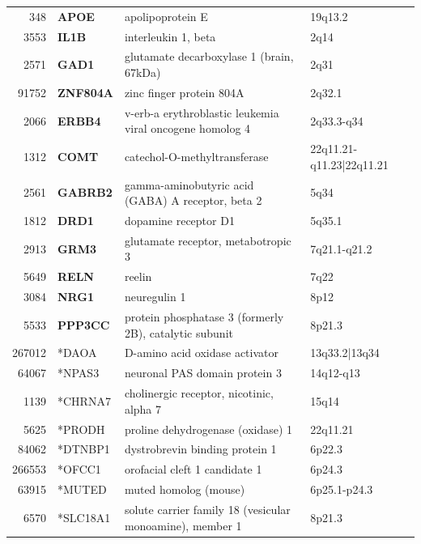 \begin{table}[]
\begin{tabular}{@{}rlll@{}}
348 & \textbf{APOE} & apolipoprotein E & 19q13.2 \\
3553 & \textbf{IL1B} & interleukin 1, beta & 2q14 \\
2571 & \textbf{GAD1} & glutamate decarboxylase 1 (brain, 67kDa) & 2q31 \\
91752 & \textbf{ZNF804A} & zinc finger protein 804A & 2q32.1 \\
2066 & \textbf{ERBB4} & v-erb-a erythroblastic leukemia viral oncogene homolog 4 & 2q33.3-q34 \\
1312 & \textbf{COMT} & catechol-O-methyltransferase & 22q11.21-q11.23|22q11.21 \\
2561 & \textbf{GABRB2} & gamma-aminobutyric acid (GABA) A receptor, beta 2 & 5q34 \\
1812 & \textbf{DRD1} & dopamine receptor D1 & 5q35.1 \\
2913 & \textbf{GRM3} & glutamate receptor, metabotropic 3 & 7q21.1-q21.2 \\
5649 & \textbf{RELN} & reelin & 7q22 \\
3084 & \textbf{NRG1} & neuregulin 1 & 8p12 \\
5533 & \textbf{PPP3CC} & protein phosphatase 3 (formerly 2B), catalytic subunit & 8p21.3 \\
267012 & *DAOA & D-amino acid oxidase activator & 13q33.2|13q34 \\
64067 & *NPAS3 & neuronal PAS domain protein 3 & 14q12-q13 \\
1139 & *CHRNA7 & cholinergic receptor, nicotinic, alpha 7 & 15q14 \\
5625 & *PRODH & proline dehydrogenase (oxidase) 1 & 22q11.21 \\
84062 & *DTNBP1 & dystrobrevin binding protein 1 & 6p22.3 \\
266553 & *OFCC1 & orofacial cleft 1 candidate 1 & 6p24.3 \\
63915 & *MUTED & muted homolog (mouse) & 6p25.1-p24.3 \\
6570 & *SLC18A1 & solute carrier family 18 (vesicular monoamine), member 1 & 8p21.3 \\ \bottomrule
\end{tabular}

\end{table}

